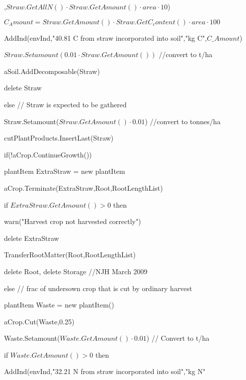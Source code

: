 \documentclass[%
]{scrartcl}
\begin{document}
{{{,$Straw.GetAllN() \cdot Straw.GetAmount() \cdot area \cdot 10$)
        
   \quad \quad    $C_Amount = Straw.GetAmount() \cdot Straw.GetC_content() 
\cdot area \cdot 100$
         
   \quad \quad AddInd(envInd,"40.81 C from straw incorporated into soil","kg C",$C\_Amount$)
          
  \quad \quad $Straw.Setamount(0.01 \cdot Straw.GetAmount()) $  //convert to t/ha
        
  \quad \quad   aSoil.AddDecomposable(Straw)
       
   \quad \quad   delete Straw
         


        
  \quad else  // Straw is expected to be gathered
       
 
    \quad \quad  \quad        Straw.Setamount($Straw.GetAmount() \cdot 0.01$)   //convert to tonnes/ha
    
\quad \quad   \quad       cutPlantProducts.InsertLast(Straw)
         
      
   if(!aCrop.ContinueGrowth())
              
     \quad	              	plantItem   ExtraStraw = new plantItem
    
 \quad	              	 aCrop.Terminate(ExtraStraw,Root,RootLengthList)
      
  \quad	           	if $ExtraStraw.GetAmount()>0$ then
      
   \quad	  \quad	          		warn("Harvest crop not harvested correctly")
       
 \quad	           	delete ExtraStraw
      
 \quad	            	 TransferRootMatter(Root,RootLengthList)
      
  \quad	           	delete Root,        
          	delete Storage    //NJH March 2009
              
     
      else   
   	 // frac of undersown crop that is cut by ordinary harvest
    
  \quad	     plantItem   Waste = new plantItem()
    
 \quad	      aCrop.Cut(Waste,0.25)
     
\quad	      Waste.Setamount($Waste.GetAmount() \cdot 0.01$)      // Convert to t/ha
    
 \quad	      if $Waste.GetAmount()>0$ then
         
   
 \quad	  \quad	          AddInd(envInd,"32.21 N from straw incorporated into soil","kg N"

}}}
\end{document}
